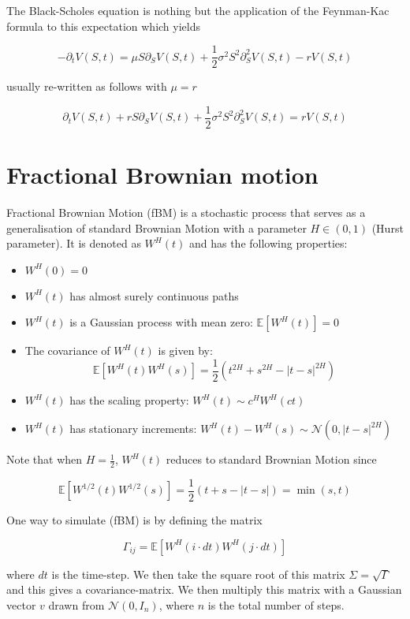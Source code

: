 \documentclass[11pt,a4paper]{article}
\begin{document}
The Black-Scholes equation is nothing but the application of the Feynman-Kac formula to this expectation which yields

\begin{equation}
-\partial_tV(S,t) = \mu S \partial_SV(S,t)+ \frac{1}{2}\sigma^2S^2\partial^2_SV(S,t)- rV(S,t)  
\end{equation}

usually re-written as follows with $\mu = r$

\begin{equation}
    \partial_tV(S,t) +r S \partial_SV(S,t)+ \frac{1}{2}\sigma^2S^2\partial^2_SV(S,t)= rV(S,t)  
    \end{equation}


\section{Fractional Brownian motion}

Fractional Brownian Motion (fBM) is a stochastic process that serves as a generalisation of standard Brownian Motion with a parameter \( H \in (0, 1) \) (Hurst parameter). It is denoted as \( W^H(t) \) and has the following properties:

\begin{itemize}
    \item \( W^H(0) = 0 \)
    \item \( W^H(t) \) has almost surely continuous paths
    \item \( W^H(t) \) is a Gaussian process with mean zero: \( \mathbb{E}[W^H(t)] = 0 \)
    \item The covariance of \( W^H(t) \) is given by:
    \[
    \mathbb{E}[W^H(t) W^H(s)] = \frac{1}{2} \left( t^{2H} + s^{2H} - |t - s|^{2H} \right)
    \]
     \item \( W^H(t) \) has the scaling property: \( W^H(t) \sim c^{H}W^{H}(ct) \)
     \item $W^{H}(t)$ has stationary increments: $W^{H}(t)-W^{H}(s) \sim \mathcal{N}(0,|t-s|^{2H})$
\end{itemize}


Note that when \( H = \frac{1}{2} \), \( W^{H}(t) \) reduces to standard Brownian Motion since 

\begin{equation}
    \mathbb{E}[W^{1/2}(t) W^{1/2}(s)] = \frac{1}{2} \left( t + s - |t - s| \right) = \min(s,t)
\end{equation}

One way to simulate (fBM) is by defining the matrix

\begin{equation*}
    \Gamma_{ij} = \mathbb{E}[W^{H}(i\cdot dt) W^{H}(j \cdot dt)]
\end{equation*}

where $dt$ is the time-step. We then take the square root of this matrix $\Sigma = \sqrt{\Gamma}$ and this gives a covariance-matrix. We then multiply this matrix with a Gaussian vector $v$ drawn from $\mathcal{N}(0,I_{n})$, where $n$ is the total number of steps.
\end{document}
